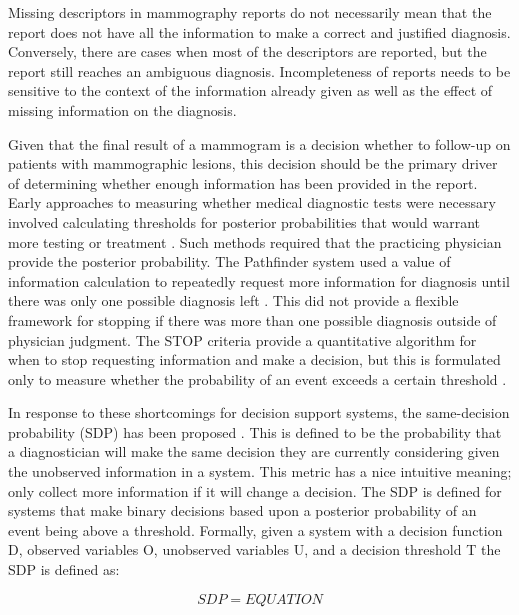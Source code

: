 Missing descriptors in mammography reports do not necessarily mean that the report does not have all the information to make a correct and justified diagnosis. Conversely, there are cases when most of the descriptors are reported, but the report still reaches an ambiguous diagnosis. Incompleteness of reports needs to be sensitive to the context of the information already given as well as the effect of missing information on the diagnosis. 

Given that the final result of a mammogram is a decision whether to follow-up on patients with mammographic lesions, this decision should be the primary driver of determining whether enough information has been provided in the report. Early approaches to measuring whether medical diagnostic tests were necessary involved calculating thresholds for posterior probabilities that would warrant more testing or treatment \cite{Pauker:1980cg}. Such methods required that the practicing physician provide the posterior probability. The Pathfinder system used a value of information calculation to repeatedly request more information for diagnosis until there was only one possible diagnosis left \cite{Heckerman:1992uq}. This did not provide a flexible framework for stopping if there was more than one possible diagnosis outside of physician judgment. The STOP criteria provide a quantitative algorithm for when to stop requesting information and make a decision, but this is formulated only to measure whether the probability of an event exceeds a certain threshold \cite{Gaag:2011gs}. 

In response to these shortcomings for decision support systems, the same-decision probability (SDP) has been proposed \cite{Choi:2012id}. This is defined to be the probability that a diagnostician will make the same decision they are currently considering given the unobserved information in a system. This metric has a nice intuitive meaning; only collect more information if it will change a decision. The SDP is defined for systems that make binary decisions based upon a posterior probability of an event being above a threshold. Formally, given a system with a decision function D, observed variables O, unobserved variables U, and a decision threshold T the SDP is defined as:

$$
SDP=EQUATION
$$

